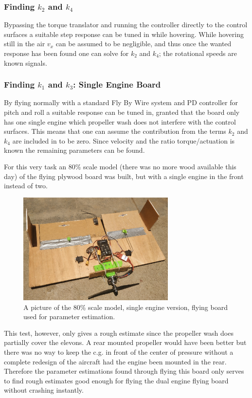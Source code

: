 \documentclass{article}
\begin{document}
\subsubsection{Finding $k_2$ and $k_4$}
Bypassing the torque translator and running the controller directly to the control surfaces a suitable step response can be tuned in while hovering.
While hovering still in the air $v_x$ can be assumed to be negligible, and thus once the wanted response has been found one can solve for $k_2$ and $k_4$; the rotational speeds are known signals.

\subsubsection{Finding $k_1$ and $k_3$: Single Engine Board}
By flying normally with a standard Fly By Wire system and PD controller for pitch and roll a suitable response can be tuned in, granted that the board only has one single engine which propeller wash does not interfere with the control surfaces.
This means that one can assume the contribution from the terms $k_2$ and $k_4$ are included in to be zero.
Since velocity and the ratio torque/actuation is known the remaining parameters can be found.

For this very task an 80\% scale model (there was no more wood available this day) of the flying plywood board was built, but with a single engine in the front instead of two.


\begin{figure}
    \center
    \includegraphics[width=0.7\textwidth]{singleengine.jpg}
    \caption{A picture of the 80\% scale model, single engine version, flying board used for parameter estimation.}
    \label{fig:singleengine}
\end{figure}

This test, however, only gives a rough estimate since the propeller wash does partially cover the elevons.
A rear mounted propeller would have been better but there was no way to keep the c.g. in front of the center of pressure without a complete redesign of the aircraft had the engine been mounted in the rear.
Therefore the parameter estimations found through flying this board only serves to find rough estimates good enough for flying the dual engine flying board without crashing instantly.
\end{document}
